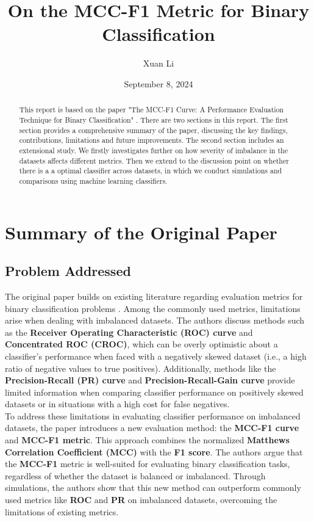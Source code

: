 \documentclass[12pt, oneside]{amsart}
\title{On the MCC-F1 Metric for Binary Classification}
\author{Xuan Li}
\date{September 8, 2024}
\theoremstyle{definition}
\theoremstyle{remark}
\numberwithin{equation}{section}
\begin{document}
\begin{abstract}
    This report is based on the paper "The MCC-F1 Curve: A Performance Evaluation Technique for Binary Classification" \citep{Cao2020}. There are two sections in this report. The first section provides a comprehensive summary of the paper, discussing the key findings, contributions, limitations and future improvements. The second section includes an extensional study. We firstly investigates further on how severity of imbalance in the datasets affects different metrics. Then we extend to the discussion point on whether there is a a optimal classifier across datasets, in which we conduct simulations and comparisons using machine learning classifiers. 
\end{abstract}
\maketitle
\tableofcontents


\section{Summary of the Original Paper}

\subsection{Problem Addressed}
The original paper builds on existing literature regarding evaluation metrics for binary classification problems \citep{Cao2020}. Among the commonly used metrics, limitations arise when dealing with imbalanced datasets. The authors discuss methods such as the \textbf{Receiver Operating Characteristic (ROC) curve} and \textbf{Concentrated ROC (CROC)}, which can be overly optimistic about a classifier's performance when faced with a negatively skewed dataset (i.e., a high ratio of negative values to true positives). Additionally, methods like the \textbf{Precision-Recall (PR) curve} and \textbf{Precision-Recall-Gain curve} provide limited information when comparing classifier performance on positively skewed datasets or in situations with a high cost for false negatives. \\

To address these limitations in evaluating classifier performance on imbalanced datasets, the paper introduces a new evaluation method: the \textbf{MCC-F1 curve} and \textbf{MCC-F1 metric}. This approach combines the normalized \textbf{Matthews Correlation Coefficient (MCC)} with the \textbf{F1 score}. The authors argue that the \textbf{MCC-F1} metric is well-suited for evaluating binary classification tasks, regardless of whether the dataset is balanced or imbalanced. Through simulations, the authors show that this new method can outperform commonly used metrics like \textbf{ROC} and \textbf{PR} on imbalanced datasets, overcoming the limitations of existing metrics.
\end{document}
